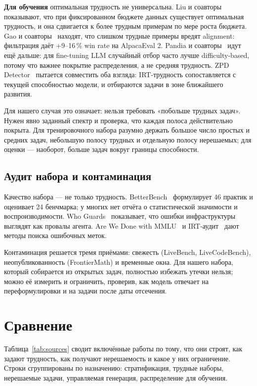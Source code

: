 \documentclass[11pt,a4paper]{article}
\begin{document}
\textbf{Для обучения} оптимальная трудность не универсальна.
Liu и соавторы~\cite{difficulty_tradeoff2026} показывают, что при
фиксированном бюджете данных существует оптимальная трудность, и она
сдвигается к более трудным примерам по мере роста бюджета. Gao и
соавторы~\cite{selective_dpo2025} находят, что слишком трудные примеры
вредят alignment: фильтрация даёт +9--16\,\% win rate на AlpacaEval 2.
Pandia и соавторы~\cite{coverage2026} идут ещё дальше: для fine-tuning LLM
случайный отбор часто лучше difficulty-based, потому что важнее покрытие
распределения, а не средняя трудность. ZPD Detector~\cite{zpd2026}
пытается совместить оба взгляда: IRT-трудность сопоставляется с текущей
способностью модели, и отбираются задачи в зоне ближайшего развития.

Для нашего случая это означает: нельзя требовать «побольше трудных задач».
Нужен явно заданный спектр и проверка, что каждая полоса действительно
покрыта. Для тренировочного набора разумно держать большое число простых и
средних задач, небольшую полосу трудных и отдельную полосу нерешаемых; для
оценки — наоборот, больше задач вокруг границы способности.

\subsection{Аудит набора и контаминация}

Качество набора — не только трудность. BetterBench~\cite{betterbench2024}
формулирует 46 практик и оценивает 24 бенчмарка; у многих нет отчёта о
статистической значимости и воспроизводимости. Who Guards~\cite{whoguards2026}
показывает, что ошибки инфраструктуры выглядят как провалы агента.
Are We Done with MMLU~\cite{mmlu_redux2024} и IRT-аудит~\cite{audit_irt2026}
дают методы поиска ошибочных меток.

Контаминация решается тремя приёмами: свежесть (LiveBench, LiveCodeBench),
неопубликованность (FrontierMath) и временные окна. Для нашего набора,
который собирается из открытых задач, полностью избежать утечки нельзя;
можно её измерить и ограничить, проверив, как модель отвечает на
переформулировки и на задачи после даты отсечения.

\section{Сравнение}

Таблица~\ref{tab:sources} сводит включённые работы по тому, что они строят,
как задают трудность, как получают нерешаемость и какое у них ограничение.
Строки сгруппированы по назначению: стратификация, трудные наборы,
нерешаемые задачи, управляемая генерация, распределение для обучения.
\end{document}
